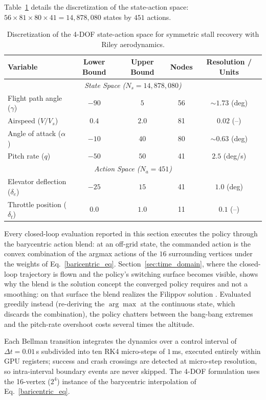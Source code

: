 \documentclass[journal ]{new-aiaa}
\begin{document}
Table~\ref{tab:4dof_discretization} details the discretization of
the state-action space: $56 \times 81 \times 80 \times 41 =
14{,}878{,}080$ states by $451$ actions.

\begin{table}[H]
\centering
\caption{Discretization of the 4-DOF state-action space for symmetric stall recovery with Riley aerodynamics.}
\label{tab:4dof_discretization}
\begin{tabular}{l c c c c}
\toprule
\textbf{Variable} & \textbf{Lower Bound} & \textbf{Upper Bound} & \textbf{Nodes} & \textbf{Resolution / Units} \\
\midrule
\multicolumn{5}{c}{\textit{State Space ($N_s = 14{,}878{,}080$)}} \\
\midrule
Flight path angle ($\gamma$) & $-90$ & $5$ & 56 & $\sim 1.73$ (deg) \\
Airspeed ($V/V_s$) & $0.4$ & $2.0$ & 81 & $0.02$ (--) \\
Angle of attack ($\alpha$) & $-10$ & $40$ & 80 & $\sim 0.63$ (deg) \\
Pitch rate ($q$) & $-50$ & $50$ & 41 & $2.5$ (deg/s) \\
\midrule
\multicolumn{5}{c}{\textit{Action Space ($N_a = 451$)}} \\
\midrule
Elevator deflection ($\delta_e$) & $-25$ & $15$ & 41 & $1.0$ (deg) \\
Throttle position ($\delta_t$) & $0.0$ & $1.0$ & 11 & $0.1$ (--) \\
\bottomrule
\end{tabular}
\end{table}

Every closed-loop evaluation reported in this
section executes the policy through the barycentric action blend: at
an off-grid state, the commanded action is the convex combination of
the argmax actions of the $16$ surrounding vertices under the weights
of Eq.~\eqref{baricentric_eq}. Section~\ref{sec:time_domain},
where the closed-loop trajectory is flown and the policy's
switching surface becomes visible, shows why the blend is the
solution concept the converged policy requires and not a
smoothing: on that surface the blend realizes the Filippov
solution \cite{Filippov1988}.
Evaluated greedily instead (re-deriving the $\arg\max$ at the
continuous state, which discards the combination), the policy
chatters between the bang-bang extremes and the pitch-rate
overshoot costs several times the altitude.

Each Bellman transition integrates the dynamics
over a control interval of $\Delta t = 0.01$\,s subdivided into ten
RK4 micro-steps of $1$\,ms, executed entirely within GPU registers;
success and crash crossings are detected at micro-step resolution,
so intra-interval boundary events are never skipped. The 4-DOF
formulation uses the 16-vertex ($2^4$) instance of the barycentric
interpolation of Eq.~\eqref{baricentric_eq}.
\end{document}
